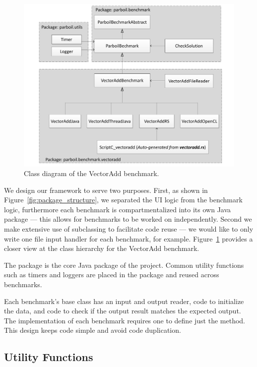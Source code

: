 \begin{figure}
\centering
\includegraphics[scale=0.3]{figs/vectoradd_class_diagram.pdf}
\caption{Class diagram of the VectorAdd benchmark.}
\label{fig:class_diagram}
\centering
\end{figure}

We design our framework to serve two purposes.
First, as shown in Figure~\ref{fig:package_structure}, we separated the UI logic from the benchmark logic, furthermore each benchmark is compartmentalized into its own Java package --- this allows for benchmarks to be worked on independently.
Second we make extensive use of subclassing to facilitate code reuse --- 
	we would like to only write one file input handler for each benchmark,
	for example.
Figure~\ref{fig:class_diagram} provides a closer
view at the class hierarchy for the VectorAdd benchmark.

The  package is the core Java package of the project.
Common utility functions such as timers and loggers are placed in the  package and reused across benchmarks.

Each benchmark's base class has an input and output reader, code to
	initialize the data, and code to check if the output result matches
	the expected output.
The implementation of each benchmark requires one to define just the 
	method.
This design keeps code simple and avoid code duplication.


\subsection{Utility Functions}

